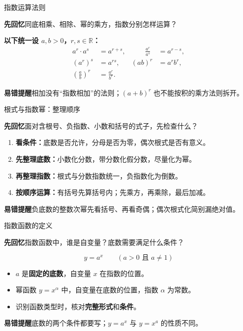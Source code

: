 \documentclass[UTF8,10pt,aspectratio=169]{ctexbeamer}
\newcommand{\Recall}[1]{\par\noindent\textcolor{KnowledgeBlue}{\textbf{先回忆}\quad #1}\par\vspace{0.3cm}}
\newcommand{\Pitfall}[1]{\par\vspace{0.22cm}\noindent\textbf{易错提醒}\quad #1\par}
\begin{document}
\begin{frame}[t]{指数运算法则}
\Recall{同底相乘、相除、幂的乘方，指数分别怎样运算？}
\pause
\textbf{以下统一设 $a,b>0$，$r,s\in\mathbb R$：}
\[
\begin{aligned}
a^r\cdot a^s&=a^{r+s},&\qquad \frac{a^r}{a^s}&=a^{r-s},\\[0.35em]
(a^r)^s&=a^{rs},&(ab)^r&=a^rb^r,\\[0.35em]
\left(\frac ab\right)^r&=\frac{a^r}{b^r}.&&
\end{aligned}
\]
\Pitfall{相加没有“指数相加”的法则；$(a+b)^r$ 也不能按积的乘方法则拆开。}
\end{frame}

\begin{frame}[t]{根式与指数幂：整理顺序}
\Recall{面对含根号、负指数、小数和括号的式子，先检查什么？}
\pause
\begin{enumerate}
\item \textbf{看条件：}底数是否允许，分母是否为零，偶次根式是否有意义。
\item \textbf{先整理底数：}小数化分数，带分数化假分数，尽量化为幂。
\item \textbf{再整理指数：}根式与分数指数统一，负指数化为倒数。
\item \textbf{按顺序运算：}有括号先算括号内；先乘方，再乘除，最后加减。
\end{enumerate}
\Pitfall{负底数的整数次幂先看括号、再看奇偶；偶次根式化简别漏绝对值。}
\end{frame}

\begin{frame}[t]{指数函数的定义}
\Recall{指数函数中，谁是自变量？底数需要满足什么条件？}
\pause
\[
\boxed{y=a^x\qquad (a>0\text{ 且 }a\ne1)}
\]
\begin{itemize}
\item $a$ 是\textbf{固定的底数}，自变量 $x$ 在指数的位置。
\item 幂函数 $y=x^\alpha$ 中，自变量在底数的位置，指数 $\alpha$ 为常数。
\item 识别函数类型时，核对\textbf{完整形式}和\textbf{条件}。
\end{itemize}
\Pitfall{底数的两个条件都要写；$y=a^x$ 与 $y=x^a$ 的性质不同。}
\end{frame}
\end{document}
